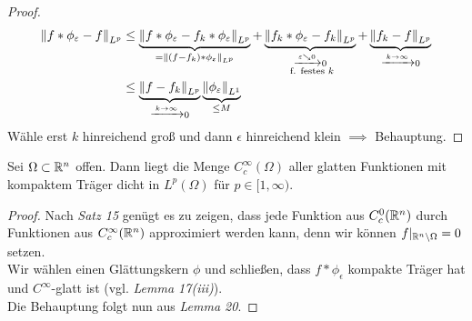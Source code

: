 \documentclass[skript.tex]{subfiles}
\begin{document}
\begin{proof}
		\begin{align*}
			\left\lVert f\ast\phi_\varepsilon-f \right\rVert_{L^p} &\leq \underbrace{\left\lVert f\ast\phi_\varepsilon-f_k\ast\phi_\varepsilon \right\rVert_{L^p}}_{=\left\lVert (f-f_k)\ast\phi_\varepsilon \right\rVert_{L^p}}
			+\underbrace{\left\lVert f_k\ast\phi_\varepsilon-f_k \right\rVert_{L^p}}_{\substack{\xrightarrow{\varepsilon\searrow 0} 0\\\text{ f. festes $k$}}}
			+\underbrace{\left\lVert f_k-f \right\rVert_{L^p}}_{\xrightarrow{k\to\infty} 0}\\
			&\leq \underbrace{\left\lVert f-f_k \right\rVert_{L^p}}_{\xrightarrow{k\to\infty} 0}
			\underbrace{\left\lVert \phi_\varepsilon \right\rVert_{L^1}}_{\leq M}
		\end{align*}
		Wähle erst $k$ hinreichend groß und dann $\epsilon$ hinreichend klein $\implies$ Behauptung.
	\end{proof}

	\begin{theorem}
		Sei $\Omega\subset\mathbb{R}^n$ offen. Dann liegt die Menge $C_c^\infty(\Omega)$ aller glatten Funktionen mit kompaktem Träger dicht in $L^p(\Omega)$ für $p\in[1,\infty)$.
	\end{theorem}
	\begin{proof}
		Nach \emph{Satz 15} genügt es zu zeigen, dass jede Funktion aus $C_c^0(\mathbb{R}^n)$ durch Funktionen aus $C_c^\infty(\mathbb{R}^n)$ approximiert werden kann, denn wir können $f\vert_{\mathbb{R}^n\setminus\Omega} = 0$ setzen.\\
		Wir wählen einen Glättungskern $\phi$ und schließen, dass $f\ast\phi_\epsilon$ kompakte Träger hat und $C^\infty$-glatt ist (vgl. \emph{Lemma 17(iii)}).\\
		Die Behauptung folgt nun aus \emph{Lemma 20}.
	\end{proof}
	
\end{document}
